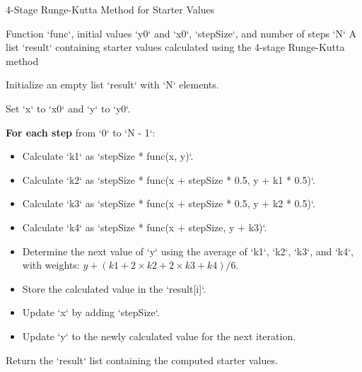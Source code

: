 \begin{algorithm}
   \caption{4-Stage Runge-Kutta Method for Starter Values}
   \label{alg:runge_kutta}
   \begin{algorithmic}[1]
   \REQUIRE Function `func`, initial values `y0` and `x0`, `stepSize`, and number of steps `N`
   \ENSURE A list `result` containing starter values calculated using the 4-stage Runge-Kutta method

   \item Initialize an empty list `result` with `N` elements.
   \item Set `x` to `x0` and `y` to `y0`.

   \item \textbf{For each step} from `0` to `N - 1`:
       \begin{itemize}
           \item Calculate `k1` as `stepSize * func(x, y)`.
           \item Calculate `k2` as `stepSize * func(x + stepSize * 0.5, y + k1 * 0.5)`.
           \item Calculate `k3` as `stepSize * func(x + stepSize * 0.5, y + k2 * 0.5)`.
           \item Calculate `k4` as `stepSize * func(x + stepSize, y + k3)`.
           
           \item Determine the next value of `y` using the average of `k1`, `k2`, `k3`, and `k4`, with weights: \(y + (k1 + 2 \times k2 + 2 \times k3 + k4) / 6\).
           
           \item Store the calculated value in the `result[i]`.
           
           \item Update `x` by adding `stepSize`.
           \item Update `y` to the newly calculated value for the next iteration.
       \end{itemize}
   
   \item Return the `result` list containing the computed starter values.
   \end{algorithmic}
\end{algorithm}

\newpage


   

